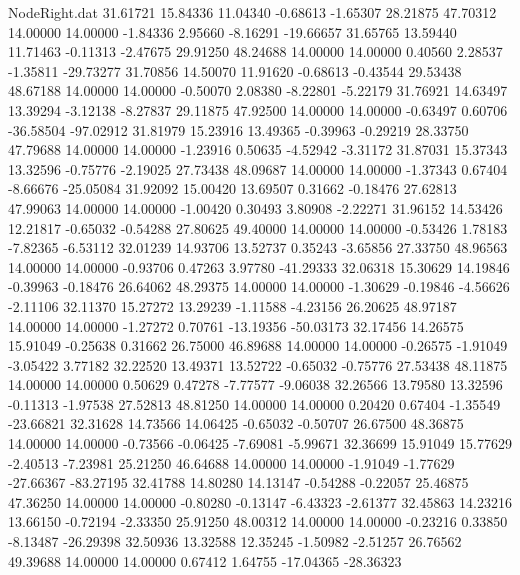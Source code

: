 \begin{filecontents}{NodeRight.dat}
  31.61721   15.84336   11.04340    -0.68613   -1.65307   28.21875   47.70312   14.00000   14.00000   -1.84336    2.95660   -8.16291  -19.66657
  31.65765   13.59440   11.71463    -0.11313   -2.47675   29.91250   48.24688   14.00000   14.00000    0.40560    2.28537   -1.35811  -29.73277
  31.70856   14.50070   11.91620    -0.68613   -0.43544   29.53438   48.67188   14.00000   14.00000   -0.50070    2.08380   -8.22801   -5.22179
  31.76921   14.63497   13.39294    -3.12138   -8.27837   29.11875   47.92500   14.00000   14.00000   -0.63497    0.60706  -36.58504  -97.02912
  31.81979   15.23916   13.49365    -0.39963   -0.29219   28.33750   47.79688   14.00000   14.00000   -1.23916    0.50635   -4.52942   -3.31172
  31.87031   15.37343   13.32596    -0.75776   -2.19025   27.73438   48.09687   14.00000   14.00000   -1.37343    0.67404   -8.66676  -25.05084
  31.92092   15.00420   13.69507     0.31662   -0.18476   27.62813   47.99063   14.00000   14.00000   -1.00420    0.30493    3.80908   -2.22271
  31.96152   14.53426   12.21817    -0.65032   -0.54288   27.80625   49.40000   14.00000   14.00000   -0.53426    1.78183   -7.82365   -6.53112
  32.01239   14.93706   13.52737     0.35243   -3.65856   27.33750   48.96563   14.00000   14.00000   -0.93706    0.47263    3.97780  -41.29333
  32.06318   15.30629   14.19846    -0.39963   -0.18476   26.64062   48.29375   14.00000   14.00000   -1.30629   -0.19846   -4.56626   -2.11106
  32.11370   15.27272   13.29239    -1.11588   -4.23156   26.20625   48.97187   14.00000   14.00000   -1.27272    0.70761  -13.19356  -50.03173
  32.17456   14.26575   15.91049    -0.25638    0.31662   26.75000   46.89688   14.00000   14.00000   -0.26575   -1.91049   -3.05422    3.77182
  32.22520   13.49371   13.52722    -0.65032   -0.75776   27.53438   48.11875   14.00000   14.00000    0.50629    0.47278   -7.77577   -9.06038
  32.26566   13.79580   13.32596    -0.11313   -1.97538   27.52813   48.81250   14.00000   14.00000    0.20420    0.67404   -1.35549  -23.66821
  32.31628   14.73566   14.06425    -0.65032   -0.50707   26.67500   48.36875   14.00000   14.00000   -0.73566   -0.06425   -7.69081   -5.99671
  32.36699   15.91049   15.77629    -2.40513   -7.23981   25.21250   46.64688   14.00000   14.00000   -1.91049   -1.77629  -27.66367  -83.27195
  32.41788   14.80280   14.13147    -0.54288   -0.22057   25.46875   47.36250   14.00000   14.00000   -0.80280   -0.13147   -6.43323   -2.61377
  32.45863   14.23216   13.66150    -0.72194   -2.33350   25.91250   48.00312   14.00000   14.00000   -0.23216    0.33850   -8.13487  -26.29398
  32.50936   13.32588   12.35245    -1.50982   -2.51257   26.76562   49.39688   14.00000   14.00000    0.67412    1.64755  -17.04365  -28.36323

\end{filecontents}
